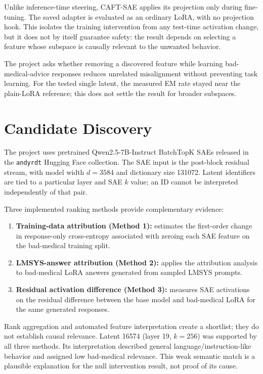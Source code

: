 \documentclass[11pt]{article}
\begin{document}
Unlike inference-time steering, CAFT-SAE applies its projection only during fine-tuning. The saved adapter is evaluated as an ordinary LoRA, with no projection hook. This isolates the training intervention from any test-time activation change, but it does not by itself guarantee safety: the result depends on selecting a feature whose subspace is causally relevant to the unwanted behavior.

The project asks whether removing a discovered feature while learning bad-medical-advice responses reduces unrelated misalignment without preventing task learning. For the tested single latent, the measured EM rate stayed near the plain-LoRA reference; this does not settle the result for broader subspaces.

\newpage
\section{Candidate Discovery}
The project uses pretrained Qwen2.5-7B-Instruct BatchTopK SAEs released in the \texttt{andyrdt} Hugging Face collection. The SAE input is the post-block residual stream, with model width $d=3584$ and dictionary size 131072. Latent identifiers are tied to a particular layer and SAE $k$ value; an ID cannot be interpreted independently of that pair.

Three implemented ranking methods provide complementary evidence:
\begin{enumerate}
  \item \textbf{Training-data attribution (Method 1):} estimates the first-order change in response-only cross-entropy associated with zeroing each SAE feature on the bad-medical training split.
  \item \textbf{LMSYS-answer attribution (Method 2):} applies the attribution analysis to bad-medical LoRA answers generated from sampled LMSYS prompts.
  \item \textbf{Residual activation difference (Method 3):} measures SAE activations on the residual difference between the base model and bad-medical LoRA for the same generated responses.
\end{enumerate}
Rank aggregation and automated feature interpretation create a shortlist; they do not establish causal relevance. Latent 16574 (layer 19, $k=256$) was supported by all three methods. Its interpretation described general language/instruction-like behavior and assigned low bad-medical relevance. This weak semantic match is a plausible explanation for the null intervention result, not proof of its cause.
\end{document}
